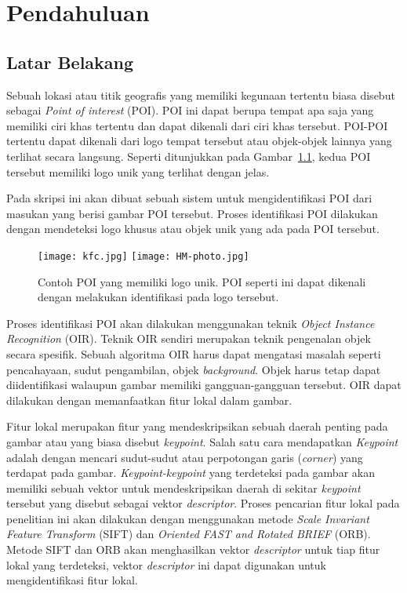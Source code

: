\chapter{Pendahuluan}
\label{chap:intro}
   
\section{Latar Belakang}
\label{sec:latar_belakang}

Sebuah lokasi atau titik geografis yang memiliki kegunaan tertentu biasa disebut sebagai \textit{Point of interest} (POI). POI ini dapat berupa tempat apa saja yang memiliki ciri khas tertentu dan dapat dikenali dari ciri khas tersebut. POI-POI tertentu dapat dikenali dari logo tempat tersebut atau objek-objek lainnya yang terlihat secara langsung. Seperti ditunjukkan pada Gambar~\ref{fig:poi_with_logo}, kedua POI tersebut memiliki logo unik yang terlihat dengan jelas.

Pada skripsi ini akan dibuat sebuah sistem untuk mengidentifikasi POI dari masukan yang berisi gambar POI tersebut. Proses identifikasi POI dilakukan dengan mendeteksi logo khusus atau objek unik yang ada pada POI tersebut.
\begin{figure}[H]
	\centering
	\texttt{[image: kfc.jpg]}
	\texttt{[image: HM-photo.jpg]}
	\caption{Contoh POI yang memiliki logo unik. POI seperti ini dapat dikenali dengan melakukan identifikasi pada logo tersebut.}
	\label{fig:poi_with_logo}
\end{figure}

Proses identifikasi POI akan dilakukan menggunakan teknik \textit{Object Instance Recognition} (OIR). Teknik OIR sendiri merupakan teknik pengenalan objek secara spesifik. Sebuah algoritma OIR harus dapat mengatasi masalah seperti pencahayaan, sudut pengambilan, objek \textit{background}. Objek harus tetap dapat diidentifikasi walaupun gambar memiliki gangguan-gangguan tersebut. OIR dapat dilakukan dengan memanfaatkan fitur lokal dalam gambar.

Fitur lokal merupakan fitur yang mendeskripsikan sebuah daerah penting pada gambar atau yang biasa disebut \textit{keypoint}. Salah satu cara mendapatkan \textit{Keypoint} adalah dengan mencari sudut-sudut atau perpotongan garis (\textit{corner}) yang terdapat pada gambar. \textit{Keypoint-keypoint} yang terdeteksi pada gambar akan memiliki sebuah vektor untuk mendeskripsikan daerah di sekitar \textit{keypoint} tersebut yang disebut sebagai vektor \textit{descriptor}. Proses pencarian fitur lokal pada penelitian ini akan dilakukan dengan menggunakan metode \textit{Scale Invariant Feature Transform} (SIFT) dan \textit{Oriented FAST and Rotated BRIEF} (ORB). Metode SIFT dan ORB akan menghasilkan vektor \textit{descriptor} untuk tiap fitur lokal yang terdeteksi, vektor \textit{descriptor} ini dapat digunakan untuk mengidentifikasi fitur lokal.

